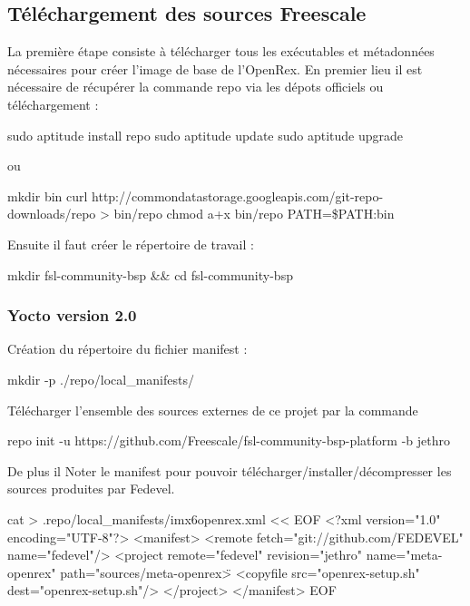 \subsection{Téléchargement des sources Freescale}
La première étape consiste à télécharger tous les exécutables et métadonnées nécessaires pour créer l’image de base de l’OpenRex. En premier lieu il est nécessaire de récupérer la commande repo via les dépots officiels ou téléchargement :

\begin{tcolorbox}
	sudo aptitude install repo
	sudo aptitude update
	sudo aptitude upgrade
\end{tcolorbox}

ou

\begin{tcolorbox}
	mkdir bin
	curl http://commondatastorage.googleapis.com/git-repo-downloads/repo > bin/repo
	chmod a+x bin/repo
	PATH=\${PATH}:bin
\end{tcolorbox}

Ensuite il faut créer le répertoire de travail :

\begin{tcolorbox}
	mkdir fsl-community-bsp \&\& cd fsl-community-bsp
	\subsubsection{Yocto version 2.0}
	Création du répertoire du fichier manifest :
\end{tcolorbox}

\begin{tcolorbox}
	mkdir -p ./repo/local\_manifests/
\end{tcolorbox}

Télécharger l’ensemble des sources externes de ce projet par la commande

\begin{tcolorbox}
	repo init -u https://github.com/Freescale/fsl-community-bsp-platform -b jethro
\end{tcolorbox}

De plus il Noter le manifest pour pouvoir télécharger/installer/décompresser les sources produites par Fedevel.

\begin{tcolorbox}
	cat > .repo/local\_manifests/imx6openrex.xml << EOF
	<?xml version="1.0" encoding="UTF-8"?>
	<manifest>
	<remote fetch="git://github.com/FEDEVEL" name="fedevel"/>
	<project remote="fedevel" revision="jethro" name="meta-openrex" path="sources/meta-openrex\">
	<copyfile src="openrex-setup.sh" dest="openrex-setup.sh"/>
	</project>
	</manifest>
	EOF
\end{tcolorbox}

